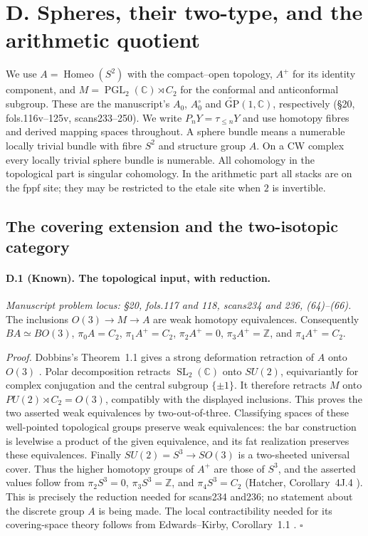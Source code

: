 \section{D. Spheres, their two-type, and the arithmetic quotient}
\label{sec:spheres}

We use $A=\operatorname{Homeo}(S^2)$ with the compact--open topology, $A^+$ for its identity component, and $M=\operatorname{PGL}_2(\mathbb C)\rtimes C_2$ for the conformal and anticonformal subgroup. These are the manuscript's $A_0$, $A_0^\circ$ and $\widetilde{\mathrm{GP}}(1,\mathbb C)$, respectively (\S20, fols.116v--125v, scans233--250). We write $P_nY=\tau_{\leq n}Y$ and use homotopy fibres and derived mapping spaces throughout. A sphere bundle means a numerable locally trivial bundle with fibre $S^2$ and structure group $A$. On a CW complex every locally trivial sphere bundle is numerable. All cohomology in the topological part is singular cohomology. In the arithmetic part all stacks are on the fppf site; they may be restricted to the etale site when $2$ is invertible.

\subsection{The covering extension and the two-isotopic category}

\paragraph{D.1 (Known). The topological input, with reduction.}
\emph{Manuscript problem locus: \S20, fols.117 and 118, scans234 and 236, (64)--(66).}
The inclusions $O(3)\longrightarrow M\longrightarrow A$ are weak homotopy equivalences. Consequently $BA\simeq BO(3)$, $\pi_0A=C_2$, $\pi_1A^+=C_2$, $\pi_2A^+=0$, $\pi_3A^+=\mathbb Z$, and $\pi_4A^+=C_2$.

\emph{Proof.} Dobbins's Theorem~1.1 gives a strong deformation retraction of $A$ onto $O(3)$ \cite{Dobbins2021}. Polar decomposition retracts $\operatorname{SL}_2(\mathbb C)$ onto $SU(2)$, equivariantly for complex conjugation and the central subgroup $\{\pm1\}$. It therefore retracts $M$ onto $PU(2)\rtimes C_2=O(3)$, compatibly with the displayed inclusions. This proves the two asserted weak equivalences by two-out-of-three. Classifying spaces of these well-pointed topological groups preserve weak equivalences: the bar construction is levelwise a product of the given equivalence, and its fat realization preserves these equivalences. Finally $SU(2)=S^3\longrightarrow SO(3)$ is a two-sheeted universal cover. Thus the higher homotopy groups of $A^+$ are those of $S^3$, and the asserted values follow from $\pi_2S^3=0$, $\pi_3S^3=\mathbb Z$, and $\pi_4S^3=C_2$ (Hatcher, Corollary~4J.4 \cite{Hatcher2002}). This is precisely the reduction needed for scans234 and236; no statement about the discrete group $A$ is being made. The local contractibility needed for its covering-space theory follows from Edwards--Kirby, Corollary~1.1 \cite{EdwardsKirby1971}. \hfill$\square$


